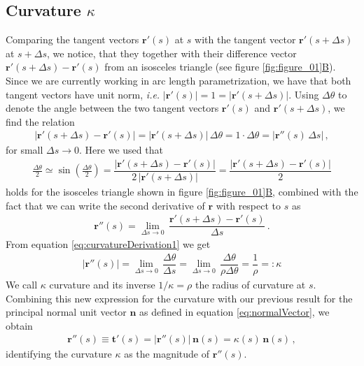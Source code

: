 \documentclass[11pt, DINA4, fleqn]{amsart}
\def\vr{\boldsymbol{r}\xspace}
\def\vrp{{\vr}'\xspace}
\def\vrpp{{\vr}''\xspace}
\def\vt{\boldsymbol{t}\xspace}
\def\vn{\boldsymbol{n}\xspace}
\begin{document}
\subsection{Curvature $\kappa$}
Comparing the tangent vectors $\vrp(s)$ at $s$ with the tangent vector $\vrp(s+\Delta s)$ at $s + \Delta s$, we notice, that they together with
their difference vector $\vrp(s+\Delta s) - \vrp (s)$ from an isosceles triangle (see figure \ref{fig:figure_01}\hyperref[fig:figure_01]{B}). Since we are currently working in arc length parametrization, we have that both
tangent vectors have unit norm, \textit{i.e.} $|\vrp(s)| = 1 = |\vrp(s+ \Delta s)|$. Using $\Delta \theta$ to denote the angle between the two tangent vectors
$\vrp(s)$ and $\vrp(s+\Delta s)$, we find the relation
\begin{align}
|\vrp(s+\Delta s) - \vrp(s)| = |\vrp(s + \Delta s)| \, \Delta\theta = 1 \cdot \Delta \theta = |\vrpp(s) \, \Delta s| \, ,
\label{eq:curvatureDerivation1}
\end{align}
for small $\Delta s\longrightarrow 0$.
Here we used that
\begin{align}
\frac{\Delta \theta}{2} \simeq \sin\left(\frac{\Delta \theta}{2}\right) = \dfrac{|\vrp(s + \Delta s) - \vrp(s)|}{2\, |\vrp(s+ \Delta s)|} = \dfrac{|\vrp(s + \Delta s) - \vrp(s)|}{2}
\end{align}
holds for the isosceles triangle shown in figure \ref{fig:figure_01}\hyperref[fig:figure_01]{B},
combined with the fact that we can write the second derivative of $\vr$ with respect to $s$ as
\begin{align}
\vrpp(s)  = \lim_{\Delta s\rightarrow 0} \, \dfrac{\vrp(s+\Delta s) - \vrp(s)}{\Delta s} \, .
\end{align}
From equation \eqref{eq:curvatureDerivation1} we get
\begin{align}
|\vrpp(s)| = \lim_{\Delta s\rightarrow 0} \, \dfrac{\Delta \theta}{\Delta s} =
\lim_{\Delta s\rightarrow 0} \, \dfrac{\Delta \theta}{\rho \Delta \theta}  = \dfrac{1}{\rho} =: \kappa
\end{align}
We call $\kappa$ curvature and its inverse $1/\kappa = \rho$ the radius of curvature at $s$.
Combining this new expression for the curvature with our previous result for the principal normal unit vector $\vn$
as defined in equation \eqref{eq:normalVector}, we obtain
\begin{align}
\vrpp(s) \equiv \vt'(s) = |\vrpp(s)|\,  \vn(s) = \kappa(s) \, \vn(s) \, ,
\end{align}
identifying the curvature $\kappa$ as the magnitude of $\vrpp(s)$.
\end{document}
